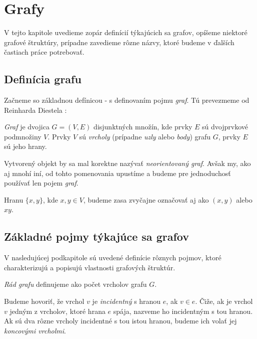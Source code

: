 \chapter{Grafy}
\label{kap:grafy}

V tejto kapitole uvedieme zopár definícií týkajúcich sa grafov, opíšeme niektoré grafové štruktúry, prípadne zavedieme rôzne názvy, ktoré budeme v ďalších častiach práce potrebovať.


\section{Definícia grafu}

Začneme so základnou defínicou - s definovaním pojmu \textit{graf}. Tú prevezmeme od Reinharda Diestela \cite[kapitola 0.1]{Diestel2000}: \newline

\textit{Graf} je dvojica $G = (V, E)$ disjunktných množín, kde prvky $E$ sú dvojprvkové podmnožiny $V$. Prvky $V$ sú \textit{vrcholy} (prípadne \textit{uzly} alebo \textit{body}) grafu $G$, prvky $E$ sú jeho hrany. \newline

Vytvorený objekt by sa mal korektne nazývať \textit{neorientovaný graf}. Avšak my, ako aj mnohí iní, od tohto pomenovania upustíme a budeme pre jednoduchosť používať len pojem \textit{graf}.\newline

Hranu $\{x, y\}$, kde $x,y\in V$, budeme zasa zvyčajne označovať aj ako $(x, y)$ alebo $xy$.


\section{Základné pojmy týkajúce sa grafov}

V nasledujúcej podkapitole sú uvedené definície rôznych pojmov, ktoré charakterizujú a popisujú vlastnosti grafových štruktúr.\newline

\textit{Rád grafu} definujeme ako počet vrcholov grafu $G$.\newline

Budeme hovoriť, že vrchol $v$ je \textit{incidentný} s hranou $e$, ak $v \in e$. Čiže, ak je vrchol $v$ jedným z vrcholov, ktoré hrana $e$ spája, nazveme ho incidentným s tou hranou. Ak sú dva rôzne vrcholy incidentné s tou istou hranou, budeme ich volať jej \textit{koncovými vrcholmi}.\newline

